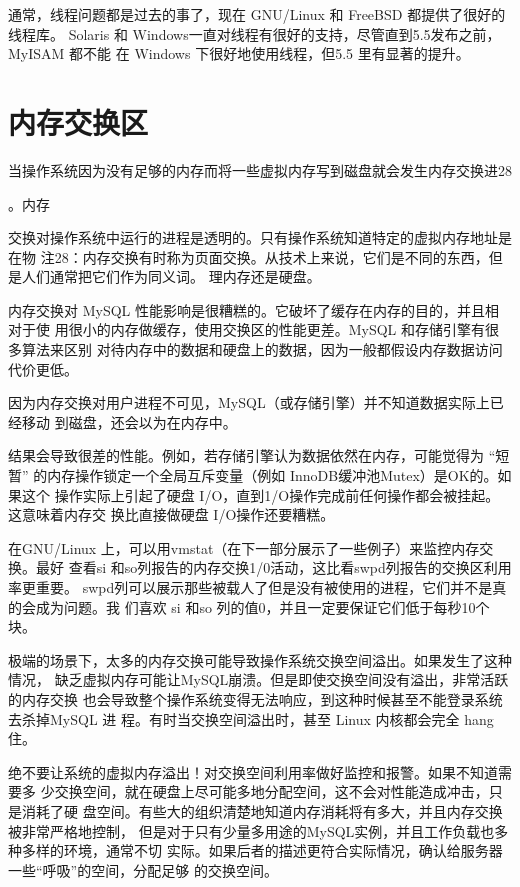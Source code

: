 通常，线程问题都是过去的事了，现在 GNU/Linux 和 FreeBSD 都提供了很好的线程库。
Solaris 和 Windows一直对线程有很好的支持，尽管直到5.5发布之前，MyISAM 都不能
在 Windows 下很好地使用线程，但5.5 里有显著的提升。

\section{内存交换区}
当操作系统因为没有足够的内存而将一些虚拟内存写到磁盘就会发生内存交换进28

。内存

交换对操作系统中运行的进程是透明的。只有操作系统知道特定的虚拟内存地址是在物
注28：内存交换有时称为页面交换。从技术上来说，它们是不同的东西，但是人们通常把它们作为同义词。
理内存还是硬盘。

内存交换对 MySQL 性能影响是很糟糕的。它破坏了缓存在内存的目的，并且相对于使
用很小的内存做缓存，使用交换区的性能更差。MySQL 和存储引擎有很多算法来区别
对待内存中的数据和硬盘上的数据，因为一般都假设内存数据访问代价更低。

因为内存交换对用户进程不可见，MySQL（或存储引擎）并不知道数据实际上已经移动
到磁盘，还会以为在内存中。

结果会导致很差的性能。例如，若存储引擎认为数据依然在内存，可能觉得为 “短暂”
的内存操作锁定一个全局互斥变量（例如 InnoDB缓冲池Mutex）是OK的。如果这个
操作实际上引起了硬盘 I/O，直到1/O操作完成前任何操作都会被挂起。这意味着内存交
换比直接做硬盘 I/O操作还要糟糕。

在GNU/Linux 上，可以用vmstat（在下一部分展示了一些例子）来监控内存交换。最好
查看si 和so列报告的内存交换1/0活动，这比看swpd列报告的交换区利用率更重要。
swpd列可以展示那些被载人了但是没有被使用的进程，它们并不是真的会成为问题。我
们喜欢 si 和so 列的值0，并且一定要保证它们低于每秒10个块。

极端的场景下，太多的内存交换可能导致操作系统交换空间溢出。如果发生了这种情况，
缺乏虚拟内存可能让MySQL崩溃。但是即使交换空间没有溢出，非常活跃的内存交换
也会导致整个操作系统变得无法响应，到这种时候甚至不能登录系统去杀掉MySQL 进
程。有时当交换空间溢出时，甚至 Linux 内核都会完全 hang 住。

绝不要让系统的虚拟内存溢出！对交换空间利用率做好监控和报警。如果不知道需要多
少交换空间，就在硬盘上尽可能多地分配空间，这不会对性能造成冲击，只是消耗了硬
盘空间。有些大的组织清楚地知道内存消耗将有多大，并且内存交换被非常严格地控制，
但是对于只有少量多用途的MySQL实例，并且工作负载也多种多样的环境，通常不切
实际。如果后者的描述更符合实际情况，确认给服务器一些“呼吸”的空间，分配足够
的交换空间。

